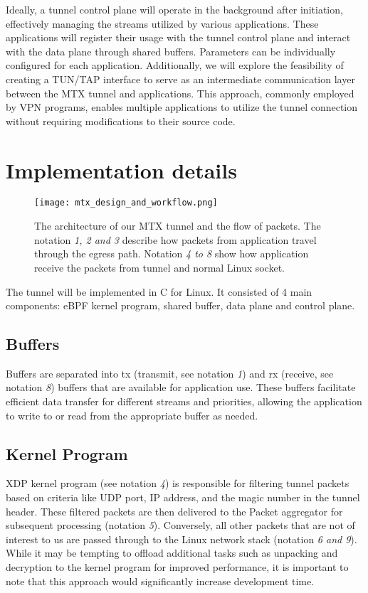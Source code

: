 Ideally, a tunnel control plane will operate in the background after initiation, effectively managing the streams utilized by various applications. 
These applications will register their usage with the tunnel control plane and interact with the data plane through shared buffers. 
Parameters can be individually configured for each application.
Additionally, we will explore the feasibility of creating a TUN/TAP interface to serve as an intermediate communication layer between the MTX tunnel and applications. 
This approach, commonly employed by VPN programs, enables multiple applications to utilize the tunnel connection without requiring modifications to their source code.

\clearpage
\section{Implementation details}

\begin{figure}[H]
	\centering
	\texttt{[image: mtx\_design\_and\_workflow.png]}
	\caption{The architecture of our MTX tunnel and the flow of packets. The notation \textit{1, 2 and 3} describe how  packets from application travel through the egress path. Notation \textit{4 to 8} show how application receive the packets from tunnel and normal Linux socket.}
	\label{fig:approach_design:mtx_design_and_workflow}
\end{figure}

The tunnel will be implemented in C for Linux. It consisted of 4 main components: eBPF kernel program, shared buffer, data plane and control plane.

\subsection{Buffers}
Buffers are separated into tx (transmit, see notation \textit{1}) and rx (receive, see notation \textit{8}) buffers that are available for application use. 
These buffers facilitate efficient data transfer for different streams and priorities, allowing the application to write to or read from the appropriate buffer as needed.

\subsection{Kernel Program}
XDP kernel program (see notation \textit{4}) is responsible for filtering tunnel packets based on criteria like UDP port, IP address, and the magic number in the tunnel header. 
These filtered packets are then delivered to the Packet aggregator for subsequent processing (notation \textit{5}). 
Conversely, all other packets that are not of interest to us are passed through to the Linux network stack (notation \textit{6 and 9}).
While it may be tempting to offload additional tasks such as unpacking and decryption to the kernel program for improved performance, it is important to note that this approach would significantly increase development time.

